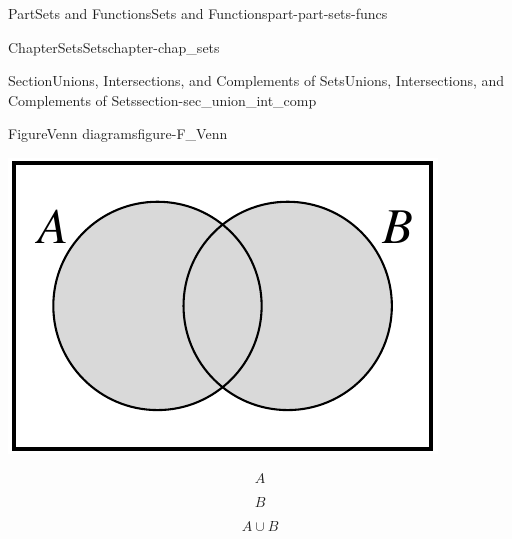 \documentclass[oneside,10pt,]{book}
\numberwithin{equation}{chapter}
\begin{document}
\begin{partptx}{Part}{Sets and Functions}{}{Sets and Functions}{}{}{part-part-sets-funcs}
\begin{chapterptx}{Chapter}{Sets}{}{Sets}{}{}{chapter-chap_sets}
\begin{sectionptx}{Section}{Unions, Intersections, and Complements of Sets}{}{Unions, Intersections, and Complements of Sets}{}{}{section-sec_union_int_comp}
\begin{figureptx}{Figure}{Venn diagrams}{figure-F_Venn}{}
\begin{sidebyside}{3}{0}{0}{0}
\begin{sbspanel}{0.333333333333333}
\includegraphics[width=\linewidth]{external/Venn_Diagram_union.pdf}
\end{sbspanel}%
\end{sidebyside}%
\begin{sidebyside}{3}{0}{0}{0}%
\begin{sbspanel}{0.333333333333333}%
%
\begin{equation*}
A
\end{equation*}
%
\end{sbspanel}%
\begin{sbspanel}{0.333333333333333}%
\par
%
\begin{equation*}
B
\end{equation*}
%
\end{sbspanel}%
\begin{sbspanel}{0.333333333333333}%
\par
%
\begin{equation*}
A \cup B
\end{equation*}
%
\end{sbspanel}%
\end{sidebyside}%
\begin{sidebyside}{3}{0}{0}{0}%
\begin{sbspanel}{0.333333333333333}%

\end{sbspanel}
\end{sidebyside}
\end{figureptx}
\end{sectionptx}
\end{chapterptx}
\end{partptx}
\end{document}
